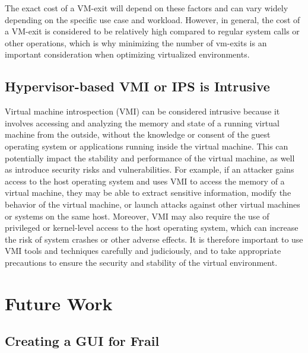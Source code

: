 \documentclass{report}
\begin{document}
\begin{spacing}{1.5}
{\large
\noindent The exact cost of a VM-exit will depend on these factors and can vary widely depending on the specific use case and workload. However, in general, the cost of a VM-exit is considered to be relatively high compared to regular system calls or other operations, which is why minimizing the number of vm-exits is an important consideration when optimizing virtualized environments.
\newline 
}




\section{Hypervisor-based VMI or IPS is Intrusive}

{\large
Virtual machine introspection (VMI) can be considered intrusive because it involves accessing and analyzing the memory and state of a running virtual machine from the outside, without the knowledge or consent of the guest operating system or applications running inside the virtual machine. This can potentially impact the stability and performance of the virtual machine, as well as introduce security risks and vulnerabilities. For example, if an attacker gains access to the host operating system and uses VMI to access the memory of a virtual machine, they may be able to extract sensitive information, modify the behavior of the virtual machine, or launch attacks against other virtual machines or systems on the same host. Moreover, VMI may also require the use of privileged or kernel-level access to the host operating system, which can increase the risk of system crashes or other adverse effects. It is therefore important to use VMI tools and techniques carefully and judiciously, and to take appropriate precautions to ensure the security and stability of the virtual environment.
\newline
}






\chapter{Future Work}

\section{Creating a GUI for Frail}



\end{spacing}
\end{document}

